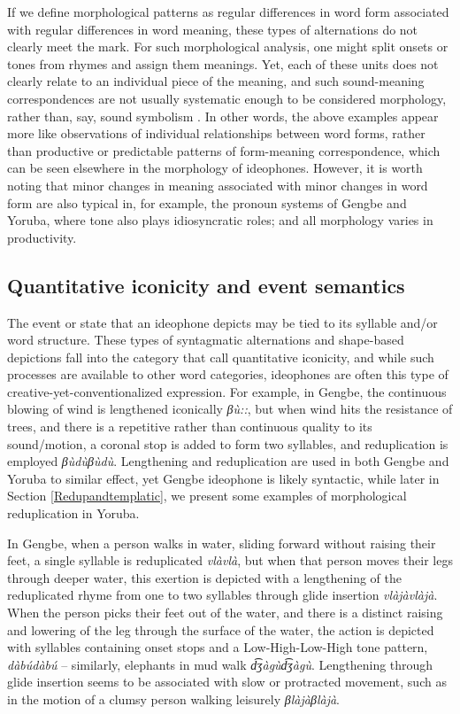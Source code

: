 \documentclass[output=paper,colorlinks,citecolor=brown]{langscibook}
\begin{document}
If we define morphological patterns as regular differences in word form associated with regular differences in word meaning, these types of alternations do not clearly meet the mark. For such morphological analysis, one might split onsets or tones from rhymes and assign them meanings. Yet, each of these units does not clearly relate to an individual piece of the meaning, and such sound-meaning correspondences are not usually systematic enough to be considered morphology, rather than, say, sound symbolism \citep{Hintonetal1994}. In other words, the above examples appear more like observations of individual relationships between word forms, rather than productive or predictable patterns of form-meaning correspondence, which can be seen elsewhere in the morphology of ideophones. However, it is worth noting that minor changes in meaning associated with minor changes in word form are also typical in, for example, the pronoun systems of Gengbe and Yoruba, where tone also plays idiosyncratic roles; and all morphology varies in productivity.

\subsection{Quantitative iconicity and event semantics}

The event or state that an ideophone  depicts may be tied to its syllable and/or word structure. These types of syntagmatic alternations and shape-based depictions fall into the category that \citet{CarlingandJohansson2015} call quantitative iconicity, and while such processes are available to other word categories, ideophones are often this type of creative-yet-conventionalized expression. For example, in Gengbe, the continuous blowing of wind is lengthened iconically \textit{βù::}, but when wind hits the resistance of trees, and there is a repetitive rather than continuous quality to its sound/motion, a coronal stop is added to form two syllables, and reduplication is employed \textit{βùdùβùdù}. Lengthening and reduplication are used in both Gengbe and Yoruba to similar effect, yet Gengbe ideophone  is likely syntactic, while later in Section \ref{Redupandtemplatic}, we present some examples of morphological reduplication in Yoruba.

In Gengbe, when a person walks in water, sliding forward without raising their feet, a single syllable is reduplicated \textit{vlàvlà}, but when that person moves their legs through deeper water, this exertion is depicted with a lengthening of the reduplicated rhyme from one to two syllables through glide insertion \textit{vlàjàvlàjà}. When the person picks their feet out of the water, and there is a  distinct raising and lowering of the leg through the surface of the water, the action is depicted with syllables containing onset stops and a Low-High-Low-High tone pattern, \textit{dàbúdàbú} -- similarly, elephants in mud walk \textit{d͡ʒàgùd͡ʒàgù}. Lengthening through glide insertion seems to be associated with slow or protracted movement, such as in the motion of a clumsy person walking leisurely \textit{βlàjàβlàjà}.
\end{document}
